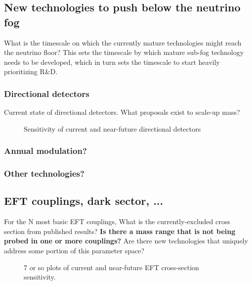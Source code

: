 
\subsection{New technologies to push below the neutrino fog}
What is the timescale on which the currently mature technologies might reach the neutrino floor? This sets the timescale by which mature sub-fog technology needs to be developed, which in turn sets the timescale to start heavily prioritizing R\&D. 



\subsubsection{Directional detectors}
Current state of directional detectors. What proposals exist to scale-up mass? 
\begin{figure}
    \centering
    \caption{Sensitivity of current and near-future directional detectors}
    \label{fig:directional_sensitivity}
\end{figure}
\subsubsection{Annual modulation?}
\subsubsection{Other technologies?}


\subsection{EFT couplings, dark sector, ...}
For the N most basic EFT couplings, What is the currently-excluded cross section from published results?  \textbf{Is there a mass range that is not being probed in one or more couplings?} Are there new technologies that uniquely address some portion of this parameter space?

\begin{figure}
    \centering
    \caption{7 or so plots of current and near-future EFT cross-section sensitivity.}
    \label{fig:EFT_sensitivity}
\end{figure}


